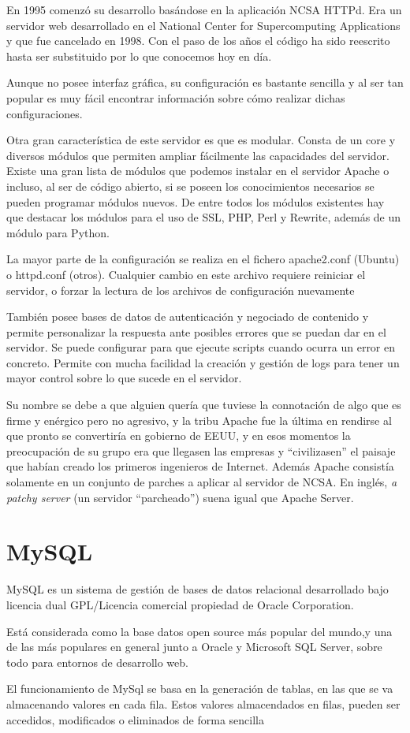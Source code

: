 En 1995 comenzó su desarrollo basándose en la aplicación NCSA HTTPd. Era un servidor web desarrollado en el National Center for Supercomputing Applications y que fue cancelado en 1998. Con el paso de los años el código ha sido reescrito hasta ser substituido por lo que conocemos hoy en día.


Aunque no posee interfaz gráfica, su configuración es bastante sencilla y al ser tan popular es muy fácil encontrar información sobre cómo realizar dichas configuraciones. 

Otra gran característica de este servidor es que es modular. Consta de un core y diversos módulos que permiten ampliar fácilmente las capacidades del servidor. Existe una gran lista de módulos que podemos instalar en el servidor Apache o incluso, al ser de código abierto, si se poseen los conocimientos necesarios se pueden programar módulos nuevos. De entre todos los módulos existentes hay que destacar los módulos para el uso de SSL, PHP, Perl y Rewrite, además de un módulo para Python. 

La mayor parte de la configuración se realiza en el fichero apache2.conf (Ubuntu) o httpd.conf (otros). Cualquier cambio en este archivo requiere reiniciar el servidor, o forzar la lectura de los archivos de configuración nuevamente

También posee bases de datos de autenticación y negociado de contenido y permite personalizar la respuesta ante posibles errores que se puedan dar en el servidor. Se puede configurar para que ejecute scripts cuando ocurra un error en concreto. Permite con mucha facilidad la creación y gestión de logs para tener un mayor control sobre lo que sucede en el servidor.


Su nombre se debe a que alguien quería que tuviese la connotación de algo que es firme y enérgico pero no agresivo, y la tribu Apache fue la última en rendirse al que pronto se convertiría en gobierno de EEUU, y en esos momentos la preocupación de su grupo era que llegasen las empresas y ``civilizasen'' el paisaje que habían creado los primeros ingenieros de Internet. Además Apache consistía solamente en un conjunto de parches a aplicar al servidor de NCSA. En inglés, \textit{a patchy server} (un servidor ``parcheado'') suena igual que Apache Server.


\section{MySQL}
\label{mysql}
MySQL es un sistema de gestión de bases de datos relacional desarrollado bajo licencia dual GPL/Licencia comercial propiedad de Oracle Corporation.

Está considerada como la base datos open source más popular del mundo,y una de las más populares en general junto a Oracle y Microsoft SQL Server, sobre todo para entornos de desarrollo web.

El funcionamiento de MySql se basa en la generación de tablas, en las que se va almacenando valores en cada fila. Estos valores almacendados en filas, pueden ser accedidos, modificados o eliminados de forma sencilla